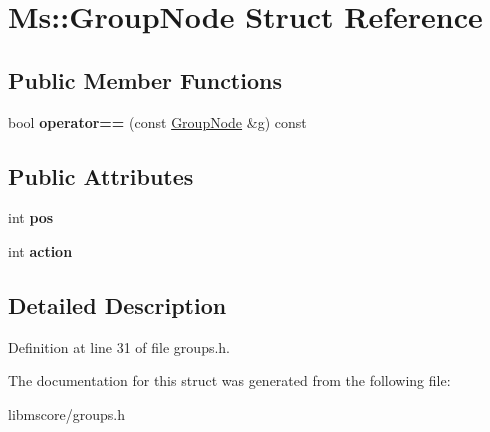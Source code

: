 \hypertarget{struct_ms_1_1_group_node}{}\section{Ms\+:\+:Group\+Node Struct Reference}
\label{struct_ms_1_1_group_node}
\subsection*{Public Member Functions}
\begin{DoxyCompactItemize}
\item 
\mbox{\label{struct_ms_1_1_group_node_aab45569e928e6b1f6a8876828bc8582d}} 
bool {\bfseries operator==} (const \hyperlink{struct_ms_1_1_group_node}{Group\+Node} \&g) const
\end{DoxyCompactItemize}
\subsection*{Public Attributes}
\begin{DoxyCompactItemize}
\item 
\mbox{\label{struct_ms_1_1_group_node_a78b7690f51db80fc40be71ee7c287f76}} 
int {\bfseries pos}
\item 
\mbox{\label{struct_ms_1_1_group_node_adf6cfe3474c7d00ab5d9e01389230c8c}} 
int {\bfseries action}
\end{DoxyCompactItemize}


\subsection{Detailed Description}


Definition at line 31 of file groups.\+h.



The documentation for this struct was generated from the following file\+:\begin{DoxyCompactItemize}
\item 
libmscore/groups.\+h\end{DoxyCompactItemize}
